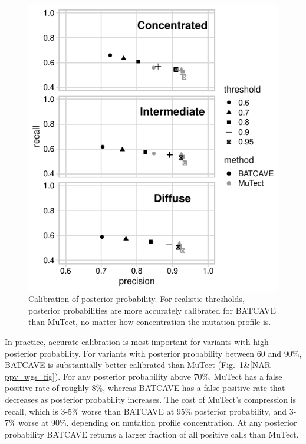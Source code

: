 \documentclass[a4,center,fleqn]{NAR}
\newcommand{\batcave}{BATCAVE\xspace}
\begin{document}
\begin{figure}
  \begin{center}
  \includegraphics{figures/ppv_wes.pdf}
  \end{center}
  \caption{Calibration of posterior probability. 
  For realistic thresholds, posterior probabilities are more accurately calibrated for \batcave than MuTect, no matter how concentration the mutation profile is.}
\label{NAR-ppv_fig}
\end{figure}

In practice, accurate calibration is most important for variants with high posterior probability.
For variants with posterior probability between 60 and 90\%, \batcave is substantially better calibrated than MuTect (Fig.~\ref{NAR-ppv_fig}\&\ref{NAR-ppv_wgs_fig}).
For any posterior probability above 70\%, MuTect has a false positive rate of roughly 8\%, whereas \batcave has a false positive rate that decreases as posterior probability increases.
The cost of MuTect's compression is recall, which is 3-5\% worse than \batcave at 95\% posterior probability, and 3-7\% worse at 90\%, depending on mutation profile concentration.
At any posterior probability \batcave returns a larger fraction of all positive calls than MuTect.
\end{document}
